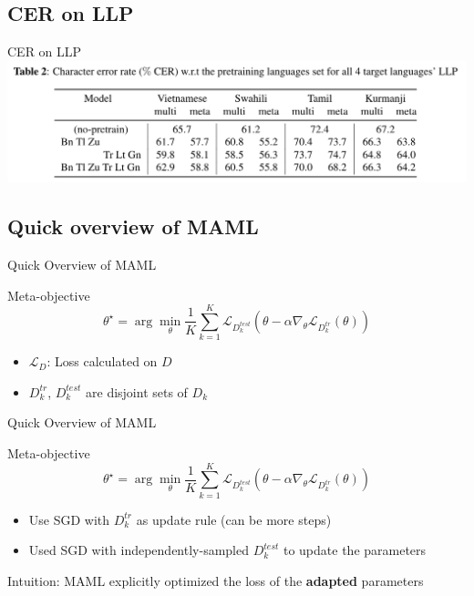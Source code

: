 \documentclass{beamer}
\begin{document}
\subsection{CER on LLP}
\begin{frame}[t]{CER on LLP}
  \center \includegraphics[width=1.0\textwidth]{fig/llp_table.png}
\end{frame}

\subsection{Quick overview of MAML}

\begin{frame}[t]{Quick Overview of MAML}
  \label{overview of maml}
  \begin{block}{Meta-objective}
    \begin{equation*}
    \theta^\star = \arg \min_\theta \frac{1}{K}\sum_{k=1}^{K}\mathcal{L}_{D_k^{test}}(\theta - \alpha \nabla_\theta \mathcal{L}_{D_k^{tr}}(\theta))
    \end{equation*}
  \end{block}

  \begin{itemize}
    \item $\mathcal{L}_D$: Loss calculated on $D$
    \item $D_k^{tr}$, $D_k^{test}$ are disjoint sets of $D_k$
  \end{itemize}
\end{frame}

\begin{frame}[t]{Quick Overview of MAML}
  \begin{block}{Meta-objective}
    \begin{equation*}
    \theta^\star = \arg \min_\theta \frac{1}{K}\sum_{k=1}^{K}\mathcal{L}_{D_k^{test}}(\theta - \alpha \nabla_\theta \mathcal{L}_{D_k^{tr}}(\theta))
    \end{equation*}
  \end{block}

  \begin{itemize}
    \item Use SGD with $D_k^{tr}$ as update rule (can be more steps)
    \item Used SGD with independently-sampled $D_k^{test}$ to update the parameters
  \end{itemize}

  \vspace{1em}

  Intuition: MAML explicitly optimized the loss of the \textbf{adapted} parameters
\end{frame}
\end{document}

